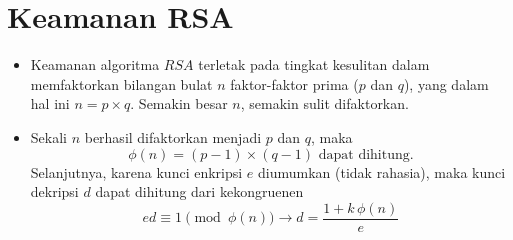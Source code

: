 \documentclass{article}
\begin{document}

\section*{Keamanan RSA}

\begin{itemize}
    \item Keamanan algoritma $RSA$ terletak pada tingkat kesulitan dalam memfaktorkan bilangan bulat $n$ faktor-faktor prima ($p$ dan $q$), yang dalam hal ini $n = p \times q$. Semakin besar $n$, semakin sulit difaktorkan.
    \item Sekali $n$ berhasil difaktorkan menjadi $p$ dan $q$, maka
    \[ \phi(n) = (p - 1) \times (q - 1) \text{ dapat dihitung.} \]
    Selanjutnya, karena kunci enkripsi $e$ diumumkan (tidak rahasia), maka kunci dekripsi $d$ dapat dihitung dari kekongruenen
    \[ ed \equiv 1 \pmod{\phi(n)} \rightarrow d = \frac{1 + k \, \phi(n)}{e} \]
\end{itemize}
\end{document}
